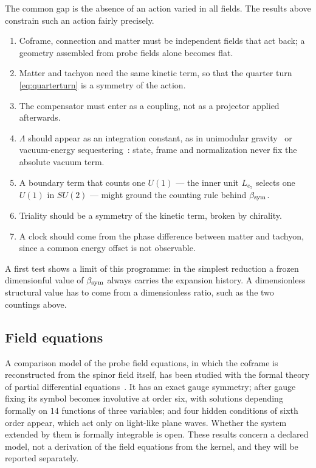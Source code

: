 The common gap is the absence of an action varied in all fields.  The results above constrain such an action fairly precisely.
\begin{enumerate}
\item Coframe, connection and matter must be independent fields that act back; a geometry assembled from probe fields alone becomes flat.
\item Matter and tachyon need the same kinetic term, so that the quarter turn \eqref{eq:quarterturn} is a symmetry of the action.
\item The compensator must enter as a coupling, not as a projector applied afterwards.
\item \(\Lambda\) should appear as an integration constant, as in unimodular gravity~\cite{henneaux} or vacuum-energy sequestering~\cite{kaloper}:
state, frame and normalization never fix the absolute vacuum term.
\item A boundary term that counts one \(U(1)\) --- the inner unit \(L_{e_7}\) selects one \(U(1)\) in \(SU(2)\) --- might ground the counting rule
behind \(\beta_{\rm sym}\).
\item Triality should be a symmetry of the kinetic term, broken by chirality.
\item A clock should come from the phase difference between matter and tachyon, since a common energy offset is not observable.
\end{enumerate}
A first test shows a limit of this programme: in the simplest reduction a frozen dimensionful value of \(\beta_{\rm sym}\) always carries the
expansion history.  A dimensionless structural value has to come from a dimensionless ratio, such as the two countings above.

\subsection{Field equations}

A comparison model of the probe field equations, in which the coframe is reconstructed from the spinor field itself, has been studied with
the formal theory of partial differential equations~\cite{bryant,seiler}.  It has an exact gauge symmetry; after gauge fixing its symbol
becomes involutive at order six, with solutions depending formally on \(14\) functions of three variables; and four hidden conditions of
sixth order appear, which act only on light-like plane waves.  Whether the system extended by them is formally integrable is open.  These
results concern a declared model, not a derivation of the field equations from the kernel, and they will be reported separately.

